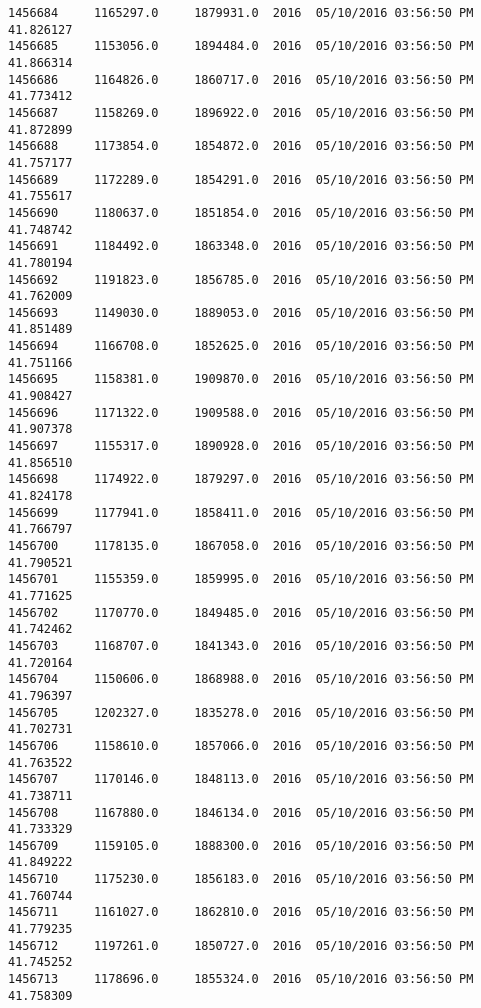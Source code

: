 \documentclass[11pt]{article}
\begin{document}
\begin{Verbatim}[commandchars=\\\{\}]
1456684     1165297.0     1879931.0  2016  05/10/2016 03:56:50 PM  41.826127   
1456685     1153056.0     1894484.0  2016  05/10/2016 03:56:50 PM  41.866314   
1456686     1164826.0     1860717.0  2016  05/10/2016 03:56:50 PM  41.773412   
1456687     1158269.0     1896922.0  2016  05/10/2016 03:56:50 PM  41.872899   
1456688     1173854.0     1854872.0  2016  05/10/2016 03:56:50 PM  41.757177   
1456689     1172289.0     1854291.0  2016  05/10/2016 03:56:50 PM  41.755617   
1456690     1180637.0     1851854.0  2016  05/10/2016 03:56:50 PM  41.748742   
1456691     1184492.0     1863348.0  2016  05/10/2016 03:56:50 PM  41.780194   
1456692     1191823.0     1856785.0  2016  05/10/2016 03:56:50 PM  41.762009   
1456693     1149030.0     1889053.0  2016  05/10/2016 03:56:50 PM  41.851489   
1456694     1166708.0     1852625.0  2016  05/10/2016 03:56:50 PM  41.751166   
1456695     1158381.0     1909870.0  2016  05/10/2016 03:56:50 PM  41.908427   
1456696     1171322.0     1909588.0  2016  05/10/2016 03:56:50 PM  41.907378   
1456697     1155317.0     1890928.0  2016  05/10/2016 03:56:50 PM  41.856510   
1456698     1174922.0     1879297.0  2016  05/10/2016 03:56:50 PM  41.824178   
1456699     1177941.0     1858411.0  2016  05/10/2016 03:56:50 PM  41.766797   
1456700     1178135.0     1867058.0  2016  05/10/2016 03:56:50 PM  41.790521   
1456701     1155359.0     1859995.0  2016  05/10/2016 03:56:50 PM  41.771625   
1456702     1170770.0     1849485.0  2016  05/10/2016 03:56:50 PM  41.742462   
1456703     1168707.0     1841343.0  2016  05/10/2016 03:56:50 PM  41.720164   
1456704     1150606.0     1868988.0  2016  05/10/2016 03:56:50 PM  41.796397   
1456705     1202327.0     1835278.0  2016  05/10/2016 03:56:50 PM  41.702731   
1456706     1158610.0     1857066.0  2016  05/10/2016 03:56:50 PM  41.763522   
1456707     1170146.0     1848113.0  2016  05/10/2016 03:56:50 PM  41.738711   
1456708     1167880.0     1846134.0  2016  05/10/2016 03:56:50 PM  41.733329   
1456709     1159105.0     1888300.0  2016  05/10/2016 03:56:50 PM  41.849222   
1456710     1175230.0     1856183.0  2016  05/10/2016 03:56:50 PM  41.760744   
1456711     1161027.0     1862810.0  2016  05/10/2016 03:56:50 PM  41.779235   
1456712     1197261.0     1850727.0  2016  05/10/2016 03:56:50 PM  41.745252   
1456713     1178696.0     1855324.0  2016  05/10/2016 03:56:50 PM  41.758309   


\end{Verbatim}
\end{document}
